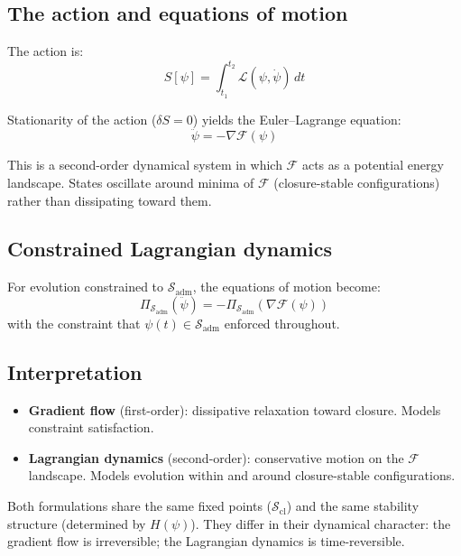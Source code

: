 \documentclass[12pt]{article}
\newcommand{\Fcal}{\mathcal{F}}
\newcommand{\Lcal}{\mathcal{L}}
\newcommand{\Sadm}{\mathcal{S}_{\mathrm{adm}}}
\newcommand{\Scl}{\mathcal{S}_{\mathrm{cl}}}
\begin{document}
\subsection{The action and equations of motion}

The action is:
\begin{equation}\label{eq:action}
    S[\psi] = \int_{t_1}^{t_2} \Lcal(\psi, \dot{\psi})\, dt
\end{equation}

Stationarity of the action ($\delta S = 0$) yields the Euler--Lagrange equation:
\begin{equation}\label{eq:EL}
    \ddot{\psi} = -\nabla\Fcal(\psi)
\end{equation}

This is a second-order dynamical system in which $\Fcal$ acts as a potential energy landscape. States oscillate around minima of $\Fcal$ (closure-stable configurations) rather than dissipating toward them.

\subsection{Constrained Lagrangian dynamics}

For evolution constrained to $\Sadm$, the equations of motion become:
\begin{equation}\label{eq:constrainedEL}
    \Pi_{\Sadm}\!\left(\ddot{\psi}\right) = -\Pi_{\Sadm}\!\left(\nabla\Fcal(\psi)\right)
\end{equation}
with the constraint that $\psi(t) \in \Sadm$ enforced throughout.

\subsection{Interpretation}

\begin{itemize}
    \item \textbf{Gradient flow} (first-order): dissipative relaxation toward closure. Models constraint satisfaction.
    \item \textbf{Lagrangian dynamics} (second-order): conservative motion on the $\Fcal$ landscape. Models evolution within and around closure-stable configurations.
\end{itemize}

Both formulations share the same fixed points ($\Scl$) and the same stability structure (determined by $H(\psi)$). They differ in their dynamical character: the gradient flow is irreversible; the Lagrangian dynamics is time-reversible.
\end{document}
